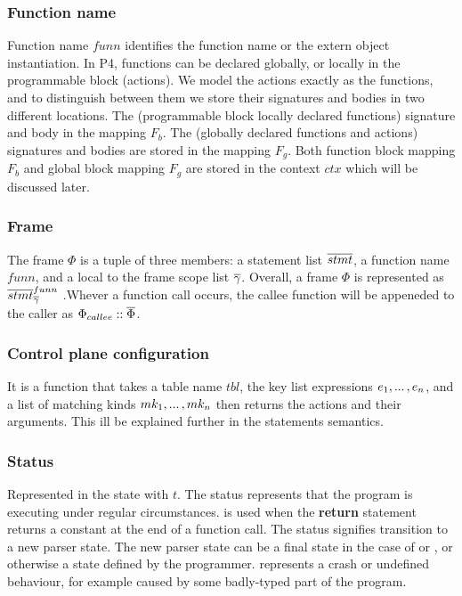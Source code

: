 \documentclass[UTF8]{article}
\begin{document}
\subsubsection*{Function name}
Function name $funn$ identifies the function name or the extern object instantiation. In P4, functions can be declared globally, or locally in the programmable block (actions). We model the actions exactly as the functions, and to distinguish between them we store their signatures and bodies in two different locations. The (programmable block locally declared functions) signature and body in the mapping $F_b$. The (globally declared functions and actions) signatures and bodies are stored in the mapping $F_g$. Both function block mapping $F_b$ and global block mapping $F_g$ are stored in the context $ctx$ which will be discussed later.


\subsubsection*{Frame}
The frame $\Phi$ is a tuple of three members: a statement list $\overline{stmt}$, a function name $funn$, and a local to the frame scope list $\overline{\gamma}$. Overall, a frame $\Phi$ is represented as $ \overline{stmt}^{funn}_{\overline{\gamma}{}} $ .Whever a function call occurs, the callee function will be appeneded to the caller as $\Phi_{callee} :: \overline{\Phi} $.


\subsubsection*{Control plane configuration}
It is a function that takes a table name $tbl$, the key list expressions $e_1 , ... \, , e_n$, and a list of matching kinds $mk_1 , ... \, , mk_n$ then returns the actions and their arguments. This ill be explained further in the statements semantics.

\subsubsection*{Status}
Represented in the state with $t$. The status \running{} represents that the program is executing under regular circumstances.  is used when the \textbf{return} statement returns a constant \cval{} at the end of a function call. The status \trans{\vn{}} signifies transition to a new parser state. The new parser state can be a final state in the case of  or , or otherwise a state defined by the programmer. \sterr{} represents a crash or undefined behaviour, for example caused by some badly-typed part of the program. 
\end{document}
